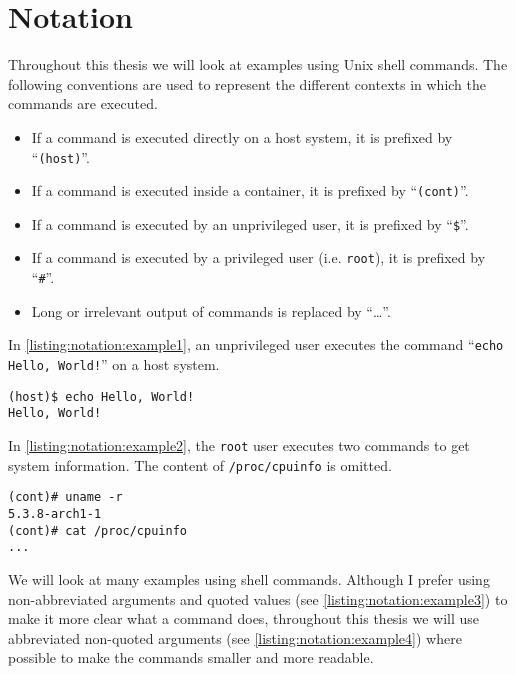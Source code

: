 \chapter{Notation}\label{chapter:notation}
Throughout this thesis we will look at examples using Unix shell commands. The following conventions are used to represent the different contexts in which the commands are executed.

\begin{itemize}
    \item If a command is executed directly on a host system, it is prefixed by ``\lstinline{(host)}''.
    \item If a command is executed inside a container, it is prefixed by ``\lstinline{(cont)}''.
    \item If a command is executed by an unprivileged user, it is prefixed by ``\lstinline{$}''.
    \item If a command is executed by a privileged user (i.e. \lstinline{root}), it is prefixed by ``\lstinline{#}''.
    \item Long or irrelevant output of commands is replaced by ``\ldots''.
\end{itemize}

In \autoref{listing:notation:example1}, an unprivileged user executes the command ``\lstinline{echo Hello, World!}'' on a host system.
\begin{lstlisting}[caption={Shell command notation example 1.}, captionpos=b, label={listing:notation:example1}]
(host)$ echo Hello, World!
Hello, World!
\end{lstlisting}

\hfill

In \autoref{listing:notation:example2}, the \lstinline{root} user executes two commands to get system information. The content of \lstinline{/proc/cpuinfo} is omitted.
\begin{lstlisting}[caption={Shell command notation example 2.}, captionpos=b, label={listing:notation:example2}]
(cont)# uname -r
5.3.8-arch1-1
(cont)# cat /proc/cpuinfo
...
\end{lstlisting}

\hfill

We will look at many examples using shell commands. Although I prefer using non-abbreviated arguments and quoted values (see \autoref{listing:notation:example3}) to make it more clear what a command does, throughout this thesis we will use abbreviated non-quoted arguments (see \autoref{listing:notation:example4}) where possible to make the commands smaller and more readable.

